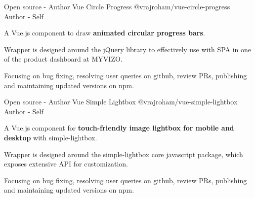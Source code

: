 \begin{cventries}
  \cventry
    {Open source - Author} %
    {Vue Circle Progress} %
    {@vrajroham/vue-circle-progress} %
    {Author - Self} %
    {
      \begin{cvitems} %
        \item{A Vue.js component to draw \textbf{animated circular progress bars}.}
        \item{Wrapper is designed around the jQuery library to effectively use with SPA in one of the product dashboard at MYVIZO.}
        \item {Focusing on bug fixing, resolving user queries on github, review PRs, publishing and maintaining updated versions on npm.}
      \end{cvitems}
    }

  \cventry
    {Open source - Author} %
    {Vue Simple Lightbox} %
    {@vrajroham/vue-simple-lightbox} %
    {Author - Self} %
    {
      \begin{cvitems} %
        \item {A Vue.js component for \textbf{touch-friendly image lightbox for mobile and desktop} with simple-lightbox.}
        \item {Wrapper is designed around the simple-lightbox core javascript package, which exposes extensive API for customization.}
        \item {Focusing on bug fixing, resolving user queries on github, review PRs, publishing and maintaining updated versions on npm.}
      \end{cvitems}
    }
\end{cventries}
